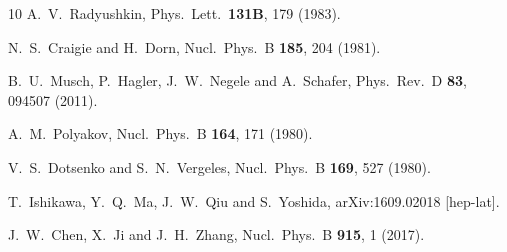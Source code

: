 \documentclass[aps,prd,twocolumn,showpacs,preprintnumbers,superscriptaddress,groupedaddress]{revtex4-1}
\begin{document}
\begin{thebibliography}{10}
  A.~V.~Radyushkin,
  Phys.\ Lett.\  {\bf 131B}, 179 (1983).



  N.~S.~Craigie and H.~Dorn,
  Nucl.\ Phys.\ B {\bf 185}, 204 (1981).



  B.~U.~Musch, P.~Hagler, J.~W.~Negele and A.~Schafer,
  Phys.\ Rev.\ D {\bf 83}, 094507 (2011).



  A.~M.~Polyakov,
  Nucl.\ Phys.\ B {\bf 164}, 171 (1980).



  V.~S.~Dotsenko and S.~N.~Vergeles,
  Nucl.\ Phys.\ B {\bf 169}, 527 (1980).



  T.~Ishikawa, Y.~Q.~Ma, J.~W.~Qiu and S.~Yoshida,
  arXiv:1609.02018 [hep-lat].



  J.~W.~Chen, X.~Ji and J.~H.~Zhang,
  Nucl.\ Phys.\ B {\bf 915}, 1 (2017).




\end{thebibliography}
\end{document}
